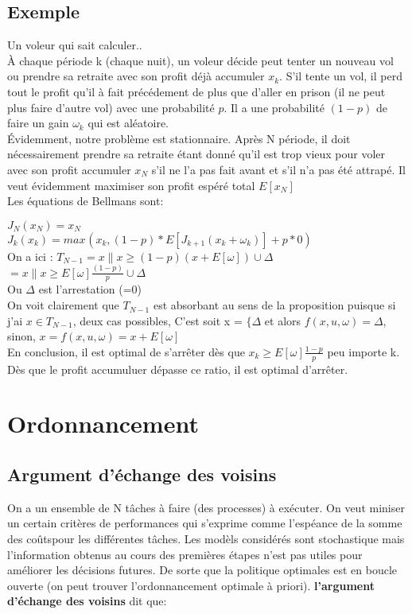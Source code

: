 \documentclass[oneside]{book}
\begin{document}
\subsection{Exemple}

Un voleur qui sait calculer..\\

À chaque période k (chaque nuit), un voleur décide peut tenter un nouveau vol ou prendre sa retraite avec son profit déjà accumuler $x_k$. S'il tente un vol, il perd tout le profit qu'il à fait précédement de plus que d'aller en prison (il ne peut plus faire d'autre vol) avec une probabilité $p$. Il a une probabilité $(1-p)$ de faire un gain $\omega_k$ qui est aléatoire.\\

Évidemment, notre problème est stationnaire. Après N période, il doit nécessairement prendre sa retraite étant donné qu'il est trop vieux pour voler avec son profit accumuler $x_N$ s'il ne l'a pas fait avant et s'il n'a pas été attrapé. Il veut évidemment maximiser son profit espéré  total $E[x_N]$\\

Les équations de Bellmans sont:

\centering
$J_N(x_N) = x_N$\\

$J_k(x_k) = max_{}(x_k, (1-p)*E[J_{k+1}(x_k + \omega_k)] + p*0)$\\

On a ici : $T_{N-1} = x \| x \geq (1-p)(x+E[\omega]) \cup \Delta$\\
 $ = x \| x \geq E[\omega]\frac{(1-p)}{p} \cup \Delta$\\
 
Ou $\Delta$ est l'arrestation (=0)\\
 
\justify
On voit clairement que $T_{N-1}$ est absorbant au sens de la proposition puisque si j'ai $x \in T_{N-1}$, deux cas possibles, C'est soit x = $\{ \Delta$ et alors $f(x,u,\omega) = \Delta$, sinon, $x = f(x,u,\omega) = x + E[\omega]$\\

En conclusion, il est optimal de s'arrêter dès que $x_k \geq E[\omega]\frac{1-p}{p}$ peu importe k. Dès que le profit accumuluer dépasse ce ratio, il est optimal d'arrêter. 


\section{Ordonnancement}
\subsection{Argument d'échange des voisins}
On a un ensemble de N tâches à faire (des processes) à exécuter. On veut miniser un certain critères de performances qui s'exprime comme l'espéance de la somme des coûtspour les différentes tâches. Les modèls considérés sont stochastique mais l'information obtenus au cours des premières étapes n'est pas utiles pour améliorer les décisions futures. De sorte que la politique optimales est en boucle ouverte (on peut trouver l'ordonnancement optimale à priori). \textbf{l'argument d'échange des voisins} dit que:\\
\end{document}
